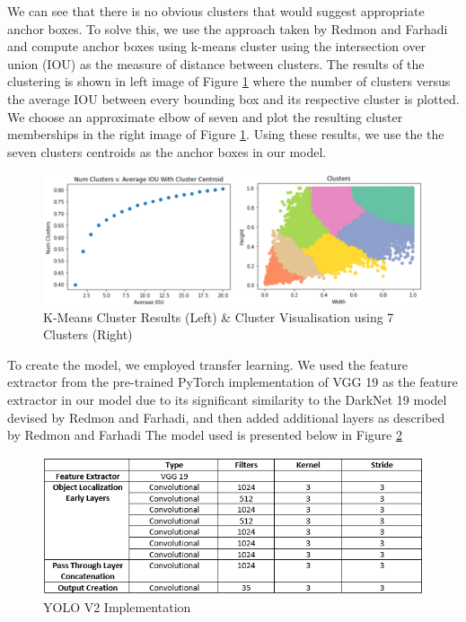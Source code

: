 \documentclass{article}
\begin{document}
\noindent We can see that there is no obvious clusters that would suggest appropriate anchor boxes.  To solve this, we use the approach taken by Redmon and Farhadi and compute anchor boxes using k-means cluster using the intersection over union (IOU) as the measure of distance between clusters.  The results of the clustering is shown in left image of Figure \ref{fig:x cluster_results} where the number of clusters versus the average IOU between every bounding box and its respective cluster is plotted.  We choose an approximate elbow of seven and plot the resulting cluster memberships in the right image of Figure \ref{fig:x cluster_results}.  Using these results, we use the the seven clusters centroids as the anchor boxes in our model.


\begin{figure}[h]
\centering
\includegraphics[scale=0.6]{final-report-images/cluster_results.png}
\caption{K-Means Cluster Results (Left) & Cluster Visualisation using 7 Clusters (Right)}
\label{fig:x cluster_results}
\end{figure}

To create the model, we employed transfer learning.  We used the feature extractor from the pre-trained PyTorch implementation of VGG 19 as the feature extractor in our model due to its significant similarity to the DarkNet 19 model devised by Redmon and Farhadi, and then added additional layers as described by Redmon and Farhadi  The model used is presented below in Figure \ref{fig:x yolo}

\begin{figure}[h]
\centering
	\includegraphics[scale=1]{final-report-images/yolo.png}
\caption{YOLO V2 Implementation}
\label{fig:x yolo}
\end{figure}
\end{document}
